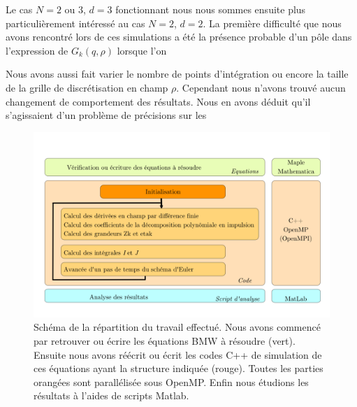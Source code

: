 \documentclass[10pt]{article}
\begin{document}
\begin{multicols}{2}
Le cas $N = 2$ ou 3, $d=3$ fonctionnant nous nous sommes ensuite plus particulièrement intéressé au cas $N = 2$, $d = 2$. La première difficulté que nous avons rencontré lors de ces simulations a été la présence probable d'un pôle dans l'expression de $G_k(q, \rho)$ lorsque l'on 

Nous avons aussi fait varier le nombre de points d'intégration ou encore la taille de la grille de discrétisation en champ $\rho$. Cependant nous n'avons trouvé aucun changement de comportement des résultats.
Nous en avons déduit qu'il s'agissaient d'un problème de précisions sur les

\end{multicols}
\begin{figure}[H]
	\begin{center}
		\includegraphics[width=0.95\columnwidth]{Diagramme_Code_2.pdf}
		\caption{Schéma de la répartition du travail effectué. Nous avons commencé par retrouver ou écrire les équations BMW à résoudre (vert). Ensuite nous avons réécrit ou écrit les codes C++ de simulation de ces équations ayant la structure indiquée (rouge). Toutes les parties orangées sont parallélisée sous OpenMP. Enfin nous étudions les résultats à l'aides de scripts Matlab.}
		\label{fig:org}
	\end{center}
\end{figure}
\end{document}
